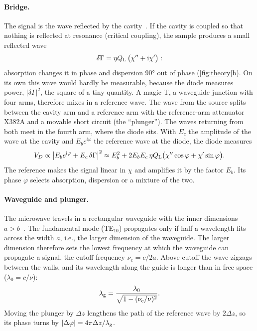 \paragraph{Bridge.}
The signal is the wave reflected by the cavity~\cite{shiroka,poole1996}. If the cavity is coupled so that nothing is reflected at resonance
(critical coupling), the sample produces a small reflected wave
\begin{equation}\label{eq:dgamma}
  \delta\Gamma=\eta Q_\mathrm{L}\,\bigl(\chi''+\mathrm{i}\chi'\bigr):
\end{equation}
absorption changes it in phase and dispersion \ang{90} out of phase (\cref{fig:theory}b). On its own this wave
would hardly be measurable, because the diode measures power, $|\delta\Gamma|^2$, the square of a tiny quantity.
A magic T, a waveguide junction with four arms, therefore mixes in a reference wave. The
wave from the source splits between the cavity arm and a reference arm with the reference-arm attenuator X382A and a movable
short circuit (the \enquote{plunger}). The waves returning from both meet in the fourth arm, where the diode
sits. With $E_c$ the amplitude of the wave at the cavity and $E_be^{\ii\varphi}$ the reference wave at the diode, the
diode measures
\begin{equation}\label{eq:diode}
  V_D\propto\bigl|E_be^{\mathrm{i}\varphi}+E_c\,\delta\Gamma\bigr|^2
  \approx E_b^2+2E_bE_c\,\eta Q_\mathrm{L}\bigl(\chi''\cos\varphi+\chi'\sin\varphi\bigr).
\end{equation}
The reference makes the signal linear in $\chi$ and amplifies it by the factor $E_b$. Its phase $\varphi$ selects
absorption, dispersion or a mixture of the two.

\paragraph{Waveguide and plunger.}
The microwave travels in a rectangular waveguide with the inner dimensions $a>b$~\cite{pozar2012}. The fundamental
mode (TE$_{10}$) propagates only if half a wavelength fits across the width $a$, i.e., the larger dimension of the
waveguide. The larger dimension therefore sets the lowest frequency at which the waveguide can propagate a signal, the
cutoff frequency $\nu_\mathrm c=c/2a$. Above cutoff the wave zigzags
between the walls, and its wavelength along the guide is longer than in free space ($\lambda_0=c/\nu$):
\begin{equation}\label{eq:lamg_theory}
  \lambda_\mathrm{g}=\frac{\lambda_0}{\sqrt{1-(\nu_\mathrm c/\nu)^2}} .
\end{equation}
Moving the plunger by $\Delta z$ lengthens the path of the reference wave by $2\Delta z$, so its phase turns by
$|\Delta\varphi|=4\pi\Delta z/\lambda_\mathrm{g}$.

